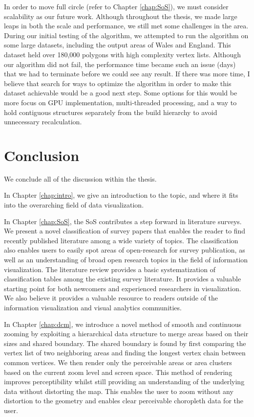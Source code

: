 In order to move full circle (refer to Chapter \ref{chap:SoS}), we must consider scalability as our future work. Although throughout the thesis, we made large leaps in both the scale and performance, we still met some challenges in the area. During our initial testing of the algorithm, we attempted to run the algorithm on some large datasets, including the output areas of Wales and England. This dataset held over 180,000 polygons with high complexity vertex lists. Although our algorithm did not fail, the performance time became such an issue (days) that we had to terminate before we could see any result. If there was more time, I believe that search for ways to optimize the algorithm in order to make this dataset achievable would be a good next step. Some options for this would be more focus on GPU implementation, multi-threaded processing, and a way to hold contiguous structures separately from the build hierarchy to avoid unnecessary recalculation.

\section{Conclusion} \label{sec:conclusion}
We conclude all of the discussion within the thesis. 

In Chapter \ref{chap:intro}, we give an introduction to the topic, and where it fits into the overarching field of data visualization.

In Chapter \ref{chap:SoS}, the SoS contributes a step forward in literature surveys. We present a novel classification of survey papers that enables the reader to find recently published literature among a wide variety of topics. The classification also enables users to easily spot areas of open-research for survey publication, as well as an understanding of broad open research topics in the field of information visualization. The literature review provides a basic systematization of classification tables among the existing survey literature. It provides a valuable starting point for both newcomers and experienced researchers in visualization. We also believe it provides a valuable resource to readers outside of the information visualization and visual analytics communities. 

In Chapter \ref{chap:dcm}, we introduce a novel method of smooth and continuous zooming by exploiting a hierarchical data structure to merge areas based on their sizes and shared boundary. The shared boundary is found by first comparing the vertex list of two neighboring areas and finding the longest vertex chain between common vertices. We then render only the perceivable areas or area clusters based on the current zoom level and screen space. This method of rendering improves perceptibility whilst still providing an understanding of the underlying data without distorting the map. This enables the user to zoom without any distortion to the geometry and enables clear perceivable choropleth data for the user. 

